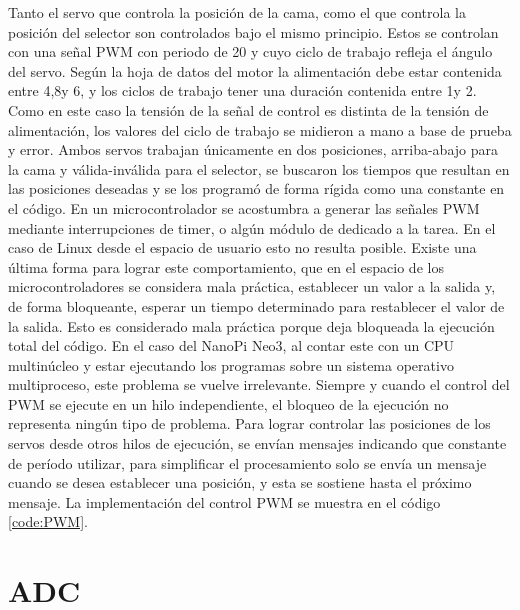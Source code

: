 \documentclass[12pt,letterpaper]{article}     %
\begin{document}
Tanto el servo que controla la posición de la cama, como el que controla la posición del selector
son controlados bajo el mismo principio. Estos se controlan con una señal PWM con periodo de 20\milli\second
y cuyo ciclo de trabajo refleja el ángulo del servo. Según la hoja de datos del motor la alimentación debe
estar contenida entre 4,8\volt y 6\volt, y los ciclos de trabajo tener una duración contenida entre 
1\milli\second y 2\milli\second. Como en este caso la tensión de la señal de control es distinta de la
tensión de alimentación, los valores del ciclo de trabajo se midieron a mano a base de prueba y error. 
Ambos servos trabajan únicamente en dos posiciones, arriba-abajo para la cama y válida-inválida para el 
selector, se buscaron los tiempos que resultan en las posiciones deseadas y se los programó de forma rígida
como una constante en el código.
En un microcontrolador se acostumbra a generar las señales PWM mediante interrupciones de timer, o algún
módulo de dedicado a la tarea. En el caso de Linux desde el espacio de usuario esto no resulta posible.
Existe una última forma para lograr este comportamiento, que en el espacio de los microcontroladores
se considera mala práctica, establecer un valor a la salida y, de forma bloqueante, esperar un tiempo
determinado para restablecer el valor de la salida. Esto es considerado mala práctica porque deja bloqueada
la ejecución total del código. En el caso del NanoPi Neo3, al contar este con un CPU multinúcleo y estar
ejecutando los programas sobre un sistema operativo multiproceso, este problema se vuelve irrelevante.
Siempre y cuando el control del PWM se ejecute en un hilo independiente, el bloqueo de la ejecución no
representa ningún tipo de problema. Para lograr controlar las posiciones de los servos desde otros hilos 
de ejecución, se envían mensajes indicando que constante de período utilizar, para simplificar el procesamiento
solo se envía un mensaje cuando se desea establecer una posición, y esta se sostiene hasta el próximo mensaje.
La implementación del control PWM se muestra en el código \ref{code:PWM}.


\section{ADC}
\end{document}
